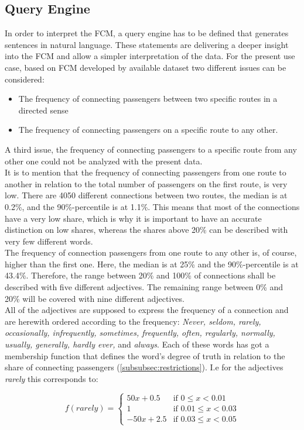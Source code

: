 \documentclass[conference]{IEEEtran}
\begin{document}
\subsection{Query Engine}
In order to interpret the FCM, a query engine has to be defined that generates sentences in natural language. These statements are delivering a deeper insight into the FCM and allow a simpler interpretation of the data. For the present use case, based on FCM developed by available dataset two different issues can be considered: 
\begin{itemize}
\item The frequency of connecting passengers between two specific routes in a directed sense
\item The frequency of connecting passengers on a specific route to any other.
\end{itemize}
A third issue, the frequency of connecting passengers to a specific route from any other one could not be analyzed with the present data.\\
It is to mention that the frequency of connecting passengers from one route to another in relation to the total number of passengers on the first route, is very low. There are 4050 different connections between two routes, the median is at 0.2\%, and the 90\%-percentile is at 1.1\%. This means that most of the connections have a very low share, which is why it is important to have an accurate distinction on low shares, whereas the shares above 20\% can be described with very few different words.\\
The frequency of connection passengers from one route to any other is, of course, higher than the first one. Here, the median is at 25\% and the 90\%-percentile is at 43.4\%. Therefore, the range between 20\% and 100\% of connections shall be described with five different adjectives. The remaining range between 0\% and 20\% will be covered with nine different adjectives.\\
All of the adjectives are supposed to express the frequency of a connection and are herewith ordered according to the frequency: \emph{Never, seldom, rarely, occasionally, infrequently, sometimes, frequently, often, regularly, normally, usually, generally, hardly ever,} and \emph{always}. Each of these words has got a membership function that defines the word's degree of truth in relation to the share of connecting passengers (\ref{subsubsec:restrictions}). I.e for the adjectives \emph{rarely} this corresponds to:

\begin{equation}
f(rarely)= \begin{cases}
50x + 0.5 & \text{if } 0 \leqslant x < 0.01\\
1 & \text{if } 0.01 \leqslant x < 0.03\\
-50x + 2.5 & \text{if } 0.03 \leqslant x < 0.05
\end{cases}
\end{equation}
\end{document}
